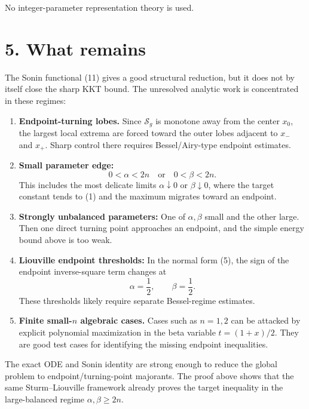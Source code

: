 \documentclass[11pt]{article}
\begin{document}
No integer-parameter representation theory is used.

\section*{5. What remains}

The Sonin functional (11) gives a good structural reduction, but it does not by itself close the sharp KKT bound. The unresolved analytic work is concentrated in these regimes:

\begin{enumerate}
\item \textbf{Endpoint-turning lobes.}
Since \(\mathcal S_g\) is monotone away from the center \(x_0\), the largest local extrema are forced toward the outer lobes adjacent to \(x_-\) and \(x_+\). Sharp control there requires Bessel/Airy-type endpoint estimates.
\item \textbf{Small parameter edge:}
\begin{equation*}
0<\alpha<2n
\quad\text{or}\quad
0<\beta<2n.
\end{equation*}
This includes the most delicate limits \(\alpha\downarrow0\) or \(\beta\downarrow0\), where the target constant tends to (1) and the maximum migrates toward an endpoint.
\item \textbf{Strongly unbalanced parameters:}
One of \(\alpha,\beta\) small and the other large. Then one direct turning point approaches an endpoint, and the simple energy bound above is too weak.
\item \textbf{Liouville endpoint thresholds:}
In the normal form (5), the sign of the endpoint inverse-square term changes at
\begin{equation*}
\alpha=\frac12,\qquad \beta=\frac12.
\end{equation*}
These thresholds likely require separate Bessel-regime estimates.
\item \textbf{Finite small-\(n\) algebraic cases.}
Cases such as \(n=1,2\) can be attacked by explicit polynomial maximization in the beta variable \(t=(1+x)/2\). They are good test cases for identifying the missing endpoint inequalities.
\end{enumerate}
The exact ODE and Sonin identity are strong enough to reduce the global problem to endpoint/turning-point majorants. The proof above shows that the same Sturm–Liouville framework already proves the target inequality in the large-balanced regime \(\alpha,\beta\ge2n\).
\end{document}
